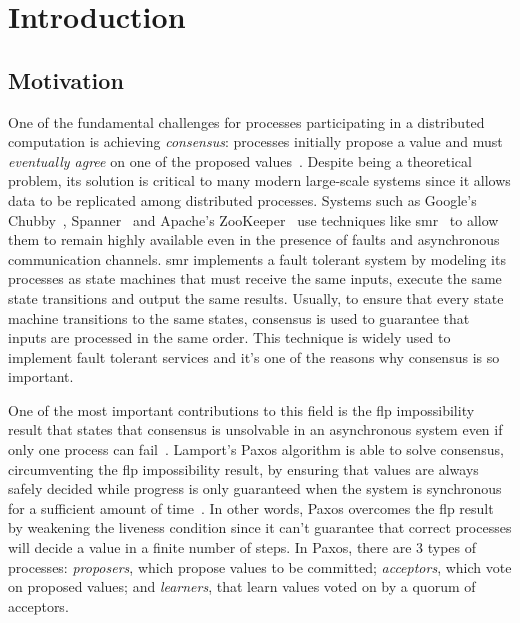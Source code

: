
\chapter{Introduction}
\section{Motivation}
One of the fundamental challenges for processes participating in a distributed computation is achieving \emph{consensus}: processes initially propose a value and must \emph{eventually agree} on one of the proposed values~\cite{vukolic2012quorum}. Despite being a theoretical problem, its solution is critical to many modern large-scale systems since it allows data to be replicated among distributed processes. Systems such as Google's Chubby~\cite{Burrows2006}, Spanner~\cite{Corbett2012} and Apache's ZooKeeper~\cite{Hunt2010} use techniques like \acrfull{smr}~\cite{time-clocks,Schneider1990} to allow them to remain highly available even in the presence of faults and asynchronous communication channels. \acrshort{smr} implements a fault tolerant system by modeling its processes as state machines that must receive the same inputs, execute the same state transitions and output the same results. Usually, to ensure that every state machine transitions to the same states, consensus is used to guarantee that inputs are processed in the same order. This technique is widely used to implement fault tolerant services and it's one of the reasons why consensus is so important.\par
One of the most important contributions to this field is the \acrfull{flp} impossibility result that states that consensus is unsolvable in an asynchronous system even if only one process can fail~\cite{Fischer1985}. Lamport's Paxos algorithm is able to solve consensus, circumventing the \acrshort{flp} impossibility result, by ensuring that values are always safely decided while progress is only guaranteed when the system is synchronous for a sufficient amount of time~\cite{Lamport2001}. In other words, Paxos overcomes the \acrshort{flp} result by weakening the liveness condition since it can't guarantee that correct processes will decide a value in a finite number of steps. In Paxos, there are 3 types of processes: \textit{proposers}, which propose values to be committed; \textit{acceptors}, which vote on proposed values; and \textit{learners}, that learn values voted on by a quorum of acceptors.\par
